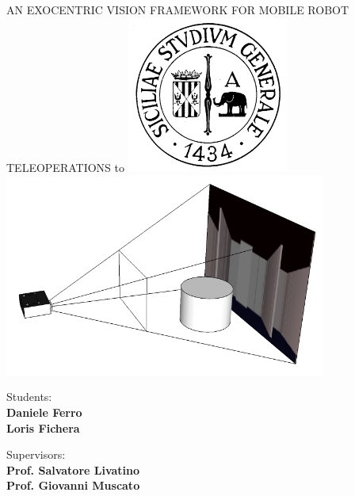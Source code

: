 \begin{titlepage}
  \begin{center}
    \uppercase{ \textsf{
        \LARGE{\framework{}} \\ 
        \vspace{0.5truecm}
        \large{an exocentric vision framework for mobile robot teleoperations}
    }}
    \hbox to \textwidth{\hrulefill}
    \vfill
    \vspace{0.5truecm}
    \includegraphics[width=150pt]{img/unict_logo.png}  %
    \includegraphics[width=300pt]{img/camera_frustum}
    \vfill
    
    \begin{flushright}
      \textsf{Students:} \\
      \textsf{\textbf{Daniele Ferro}} \\                      
      \textsf{\textbf{Loris Fichera}}
      \vspace{0.5 truecm}
                
      \textsf{Supervisors:} \\
      \textsf{\textbf{Prof. Salvatore Livatino }}\\
      \textsf{\textbf{Prof. Giovanni Muscato }}\\
    \end{flushright}
    
    \vspace{0.5 truecm}
    
  \end{center}
  
\end{titlepage}

\setlength{\baselineskip}{1.3\baselineskip} %

\newpage

